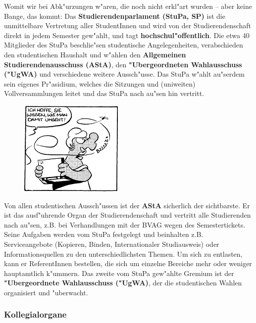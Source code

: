 Womit wir bei Abk"urzungen w"aren, die noch nicht erkl"art wurden -- aber keine 
Bange, das kommt: Das \textbf{Studierendenparlament (StuPa, SP)} ist die 
unmittelbare Vertretung aller StudentInnen und wird von der Studierendenschaft 
direkt in jedem Semester gew"ahlt, und tagt \textbf{hochschul"offentlich}.
Die etwa 40 Mitglieder des StuPa 
beschlie"sen studentische Angelegenheiten, verabschieden den studentischen 
Haushalt und w"ahlen den \textbf{Allgemeinen Studierendenausschuss (AStA)},
den \textbf{"Ubergeordneten Wahlausschuss ("UgWA)}
und verschiedene weitere Aussch"usse. Das StuPa w"ahlt au"serdem sein eigenes
Pr"asidium, welches die Sitzungen und (uniweiten) Vollversammlungen leitet und
das StuPa nach au"sen hin
vertritt.

\begin{figure}[h]
  \centering\includegraphics[width = 0.7\linewidth]{bilder/comics/otto1_2.png}
\end{figure}

Von allen studentischen Aussch"ussen ist der \textbf{AStA} sicherlich der
sichtbarste. Er ist das ausf"uhrende Organ der 
Studierendenschaft und vertritt alle Studierenden nach au"sen, z.B. bei 
Verhandlungen mit der BVAG wegen des Semestertickets. Seine Aufgaben werden vom 
StuPa festgelegt und beinhalten z.B. Serviceangebote (Kopieren, Binden, 
Internationaler Studiausweis) oder Informationsquellen zu den 
unterschiedlichsten Themen. Um sich zu entlasten, kann er ReferentInnen 
bestellen, die sich um einzelne Bereiche mehr oder weniger hauptamtlich 
k"ummern. Das zweite vom StuPa gew"ahlte Gremium ist der \textbf{"Ubergeordnete 
Wahlausschuss ("UgWA)}, der die studentischen Wahlen organisiert und "uberwacht.

\subsubsection*{Kollegialorgane}

